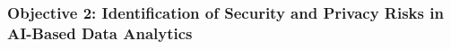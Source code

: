 \documentclass[a4paper,11pt]{article}
\newcommand{\project}[1]{\textbf{#1}\xspace}
\newcommand{\SECURITY}{\project{Security - Digital Fortress}}
\newcommand{\TheProject}{\SECURITY}
\begin{document}


\subsubsection*{Objective 2: Identification of Security and Privacy Risks in AI-Based Data Analytics}
\vspace{-6pt}
\end{document}
